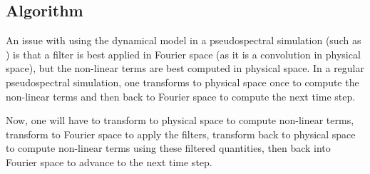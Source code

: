 \documentclass[11pt,a4paper]{article}
\begin{document}
\subsection{Algorithm}
An issue with using the dynamical model in a pseudospectral simulation (such as ) is that a filter is best applied in Fourier space (as it is a convolution in physical space), but the non-linear terms are best computed in physical space. In a regular pseudospectral simulation, one transforms to physical space once to compute the non-linear terms and then back to Fourier space to compute the next time step. 

Now, one will have to transform to physical space to compute non-linear terms, transform to Fourier space to apply the filters, transform back to physical space to compute non-linear terms using these filtered quantities, then back into Fourier space to advance to the next time step.
\end{document}
